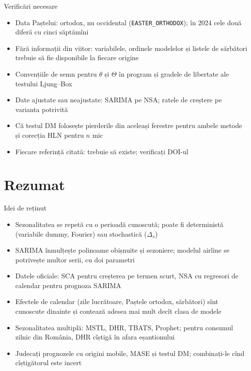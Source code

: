\begin{frame}{Verificări necesare}
\itemsize{\small}
\begin{itemize}
    \item Data Paștelui: ortodox, nu occidental (\texttt{EASTER\_ORTHODOX}); în 2024 cele două diferă cu cinci săptămîni
    \item Fără informații din viitor: variabilele, ordinele modelelor și listele de sărbători trebuie să fie disponibile la fiecare origine
    \item Convențiile de semn pentru $\theta$ și $\Theta$ în program și gradele de libertate ale testului Ljung--Box
    \item Date ajustate sau neajustate: SARIMA pe NSA; ratele de creștere pe varianta potrivită
    \item Că testul DM folosește pierderile din aceleași ferestre pentru ambele metode și corecția HLN pentru $n$ mic
    \item Fiecare referință citată: trebuie să existe; verificați DOI-ul
\end{itemize}
\end{frame}


\section{Rezumat}

\begin{frame}{Idei de reținut}
\itemsize{\small}
\begin{itemize}
    \item Sezonalitatea se repetă cu o perioadă cunoscută; poate fi deterministă (variabile dummy, Fourier) sau stochastică ($\Delta_s$)
    \item SARIMA înmulțește polinoame obișnuite și sezoniere; modelul airline se potrivește multor serii, cu doi parametri
    \item Datele oficiale: SCA pentru creșterea pe termen scurt, NSA cu regresori de calendar pentru prognoza SARIMA
    \item Efectele de calendar (zile lucrătoare, Paștele ortodox, sărbători) sînt cunoscute dinainte și contează adesea mai mult decît clasa de modele
    \item Sezonalitatea multiplă: MSTL, DHR, TBATS, Prophet; pentru consumul zilnic din România, DHR cîștigă în afara eșantionului
    \item Judecați prognozele cu origini mobile, MASE și testul DM; combinați-le cînd cîștigătorul este incert
\end{itemize}
\end{frame}

